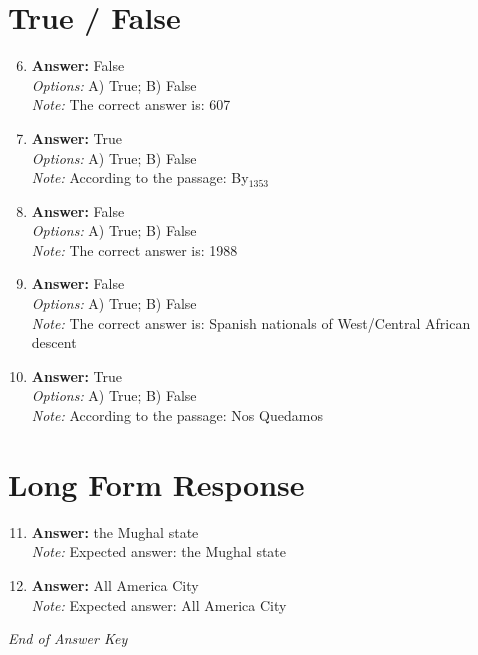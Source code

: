 \documentclass[12pt]{article}
\begin{document}
\section*{True / False}
\begin{enumerate}[label=\arabic*.]
\setcounter{enumi}{5}
\item \textbf{Answer:} False
\\ \textit{Options:} A) True; B) False
\\ \textit{Note:} The correct answer is: 607
\item \textbf{Answer:} True
\\ \textit{Options:} A) True; B) False
\\ \textit{Note:} According to the passage: By$_{1353}$
\item \textbf{Answer:} False
\\ \textit{Options:} A) True; B) False
\\ \textit{Note:} The correct answer is: 1988
\item \textbf{Answer:} False
\\ \textit{Options:} A) True; B) False
\\ \textit{Note:} The correct answer is: Spanish nationals of West/Central African descent
\item \textbf{Answer:} True
\\ \textit{Options:} A) True; B) False
\\ \textit{Note:} According to the passage: Nos Quedamos
\end{enumerate}

\section*{Long Form Response}
\begin{enumerate}[label=\arabic*.]
\setcounter{enumi}{10}
\item \textbf{Answer:} the Mughal state
\\ \textit{Note:} Expected answer: the Mughal state
\item \textbf{Answer:} All America City
\\ \textit{Note:} Expected answer: All America City
\end{enumerate}

\vfill
\noindent\textit{End of Answer Key}
\end{document}
